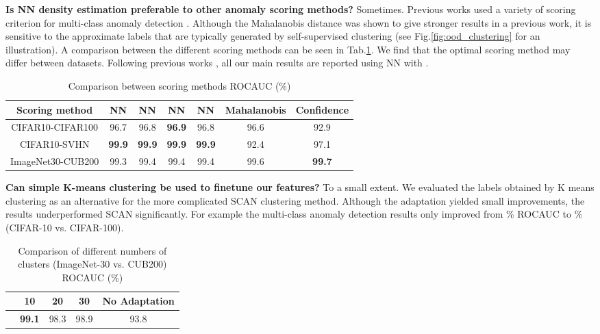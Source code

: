 \documentclass[runningheads]{llncs}
\begin{document}
\textbf{Is NN density estimation preferable to other anomaly scoring methods?} Sometimes. Previous works used a variety of scoring criterion for multi-class anomaly detection \cite{ruff2018deep,rippel2021transfer}. Although the Mahalanobis distance was shown to give stronger results in a previous work, it is sensitive to the approximate labels that are typically generated by self-supervised clustering (see Fig.\ref{fig:ood_clustering} for an illustration). A comparison between the different scoring methods can be seen in Tab.\ref{tab:scoring_comparison}. We find that the optimal scoring method may differ between datasets. Following previous works \cite{cohen2020sub}, all our main results are reported using NN with .

\begin{table}[h]
\begin{center}
\caption{Comparison between scoring methods  ROCAUC (\%)	}
\label{tab:scoring_comparison}
\begin{tabular}{ccccccc}
\toprule
Scoring method	& 	NN \quad	&	NN	\quad &	NN \quad	&	NN	\quad &	 Mahalanobis & 	Confidence	\\
\midrule									
CIFAR10-CIFAR100 &	96.7 & 96.8 &	\textbf{96.9} & 96.8 & 96.6 & 92.9	\\
CIFAR10-SVHN & \textbf{99.9}	 & \textbf{99.9}	& \textbf{99.9} &	\textbf{99.9} &	92.4 &	97.1 \\
ImageNet30-CUB200 &	99.3 &	99.4 &	99.4 &	99.4 &	99.6 &	\textbf{99.7} \\
\bottomrule
\end{tabular}
\end{center}
\end{table}


\textbf{Can simple K-means clustering be used to finetune our features?} To a small extent. We evaluated the labels obtained by K means clustering as an alternative for the more complicated SCAN clustering method. Although the adaptation yielded small improvements, the results underperformed SCAN significantly. For example the multi-class anomaly detection results only improved from \% ROCAUC to \% (CIFAR-10 vs. CIFAR-100).







\begin{table}[h]
\begin{center}
\caption{Comparison of different numbers of clusters  (ImageNet-30 vs. CUB200) ROCAUC (\%)}
\label{tab:cluster_no}
\begin{tabular}{ccccc}
\toprule
	&	10	&	 20	&	30	&	No Adaptation \\	
\midrule									
	& \textbf{99.1}	&	98.3	&	98.9 & 93.8	\\

\bottomrule
\end{tabular}
\end{center}
\end{table}
\end{document}
